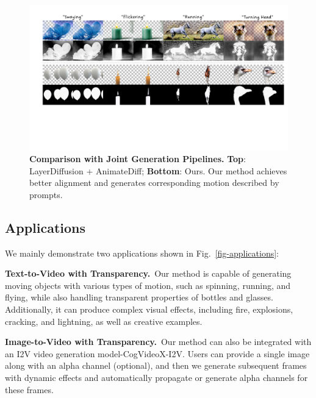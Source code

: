 \begin{figure}[htbp]
    \centering
    \includegraphics[width=1.0\linewidth]{figs/exp-comparison-generation.pdf}
    \caption{\textbf{Comparison with Joint Generation Pipelines.} \textbf{Top}: LayerDiffusion + AnimateDiff; \textbf{Bottom}: Ours. Our method achieves better alignment and generates corresponding motion described by prompts.}
    \label{fig-comparison-generation}
    \vspace{-0.1in}
\end{figure}

\subsection{Applications}
We mainly demonstrate two applications shown in Fig.~\ref{fig-applications}: 

\vspace{0.5em}
\noindent\textbf{Text-to-Video with Transparency.}~Our method is capable of generating moving objects with various types of motion, such as spinning, running, and flying, while also handling transparent properties of bottles and glasses. Additionally, it can produce complex visual effects, including fire, explosions, cracking, and lightning, as well as creative examples.

\vspace{0.5em}
\noindent\textbf{Image-to-Video with Transparency.}~Our method can also be integrated with an I2V video generation model-CogVideoX-I2V. Users can provide a single image along with an alpha channel (optional), and then we generate subsequent frames with dynamic effects and automatically propagate or generate alpha channels for these frames.



